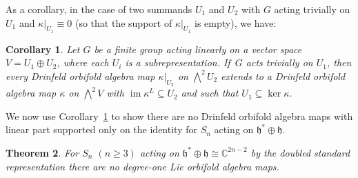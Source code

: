 \documentclass[10pt,a4paper]{amsart}
\numberwithin{equation}{section}
\newtheorem{Theorem}{Theorem}[section]
\newtheorem{Corollary}[Theorem]{Corollary}
\DeclareMathOperator{\im}{im}
\begin{document}
 As a corollary, in the case of two summands $U_1$ and $U_2$ with $G$ acting trivially on $U_1$ and $\kappa|_{U_1}\equiv 0$ (so that the support of $\kappa|_{U_1}$ is empty), we have:

\begin{Corollary}\label{prop:Extension}
	Let $G$ be a finite group acting linearly on a vector space $V=U_1\oplus U_2$, where each $U_i$ is a subrepresentation. If~$G$ acts trivially on $U_1$, then every Drinfeld orbifold algebra map $\kappa|_{U_2}$ on $\bigwedge^2 U_2$ extends to a Drinfeld orbifold algebra map $\kappa$ on $\bigwedge^2 V$ with $\im\kappa^L\subseteq U_2$ and such that $U_1\subseteq \ker\kappa$.
\end{Corollary}

We now use Corollary~\ref{prop:Extension} to show there are no Drinfeld orbifold algebra maps with linear part
supported only on the identity for $S_n$ acting on $\mathfrak{h}^* \oplus \mathfrak{h}$.

\begin{Theorem}\label{thm:LOAMapsDoubledStd}
For $S_n$ $(n \geq 3)$ acting on $\mathfrak{h}^*\oplus\mathfrak{h} \cong\mathbb{C}^{2n-2}$ by the doubled
standard representation there are no degree-one Lie orbifold algebra maps.
\end{Theorem}
\end{document}
